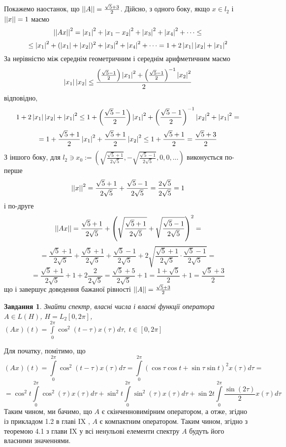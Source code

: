 \documentclass[12pt]{article} %
\newtheorem{prob}{Завдання}
\let\oldint\int
\renewcommand{\int}{\oldint\limits}
\begin{document}
	Покажемо наостанок, що $\left|\left|A\right|\right|=\frac{\sqrt{5}+3}{2}$. Дійсно, з одного боку, якщо $x\in l_2$ і $\left|\left|x\right|\right|=1$ маємо
	\[\left|\left|Ax\right|\right|^2=\left|x_1\right|^2+\left|x_1-x_2\right|^2+\left|x_3\right|^2+\left|x_4\right|^2+\dots\leq\]
	\[\leq \left|x_1\right|^2+(\left|x_1\right|+\left|x_2\right|)^2+\left|x_3\right|^2+\left|x_4\right|^2+\dots=1+2\left|x_1\right|\left|x_2\right|+\left|x_1\right|^2\]
	За нерівністю між середнім геометричним і середнім арифметичним маємо
	\[\left|x_1\right|\left|x_2\right|\leq\frac{\left({\frac{\sqrt{5}-1}{2}}\right)\left|x_1\right|^2+\left(\frac{\sqrt{5}-1}{2}\right)^{-1}\left|x_2\right|^2}{2}\]
	відповідно,
	\[1+2\left|x_1\right|\left|x_2\right|+\left|x_1\right|^2
	\leq1+\left({\frac{\sqrt{5}-1}{2}}\right)\left|x_1\right|^2+\left(\frac{\sqrt{5}-1}{2}\right)^{-1}\left|x_2\right|^2+\left|x_1\right|^2=\]
	\[=1+\frac{\sqrt{5}+1}{2}\left|x_1\right|^2+\frac{\sqrt{5}+1}{2}\left|x_2\right|^2\leq 1+\frac{\sqrt{5}+1}{2}=\frac{\sqrt{5}+3}{2}\]
	З іншого боку, для $l_2\ni x_0:=(\sqrt{\frac{\sqrt{5}+1}{2\sqrt{5}}},-\sqrt{\frac{\sqrt{5}-1}{2\sqrt{5}}},0,0,\dots)$ виконується
	по-перше
	\[\left|\left|x\right|\right|^2=\frac{\sqrt{5}+1}{2\sqrt{5}}+\frac{\sqrt{5}-1}{2\sqrt{5}}=\frac{2\sqrt{5}}{2\sqrt{5}}=1\]
	і по-друге
	\[\left|\left|Ax\right|\right|=\frac{\sqrt{5}+1}{2\sqrt{5}}+\left(\sqrt{\frac{\sqrt{5}+1}{2\sqrt{5}}}+\sqrt{\frac{\sqrt{5}-1}{2\sqrt{5}}}\right)^2=\]\[=
	\frac{\sqrt{5}+1}{2\sqrt{5}}+\frac{\sqrt{5}+1}{2\sqrt{5}}+{\frac{\sqrt{5}-1}{2\sqrt{5}}}+2\sqrt{
	\frac{\sqrt{5}+1}{2\sqrt{5}}\cdot\frac{\sqrt{5}-1}{2\sqrt{5}}}=\]
	\[=\frac{\sqrt{5}+1}{2\sqrt{5}}+1+2\frac{2}{2\sqrt{5}}=\frac{\sqrt{5}+5}{2\sqrt{5}}+1=\frac{1+\sqrt{5}}{2}+1=\frac{\sqrt{5}+3}{2}\]
	що і завершує доведення бажаної рівності $\left|\left|A\right|\right|=\frac{\sqrt{5}+3}{2}$
\begin{prob}Знайти спектр, власні числа і власні функції оператора $A\in L(H)$, $H=L_2[0,2\pi]$, $(Ax)(t)=\int_0^{2\pi}\cos^2(t-\tau)x(\tau)
	d\tau,\;t\in[0,2\pi]$
\end{prob}
Для початку, помітимо, що
\newcommand{\myint}[1]{\int_0^{2\pi}#1x(\tau)d\tau}
\[(Ax)(t)=\int_0^{2\pi}\cos^2(t-\tau)x(\tau)d\tau=\int_0^{2\pi}(\cos\tau\cos t+\sin\tau\sin t)^2x(\tau)d\tau=\]
\[=\cos^2 t\myint{\cos^2(\tau)}+\sin^2 t\myint{\sin^2(\tau)}+\sin 2t\myint{\frac{\sin (2\tau)}{2}}\]
Таким чином, ми бачимо, що $A$ є скінченновимірним оператором, а отже, згідно із прикладом 1.2 в главі IX \cite{tb}, 
$A$ є компактним оператором. Таким чином, згідно з теоремою 4.1 з глави IX у \cite{tb} всі ненульові елементи спектру $A$ будуть його власними
значеннями.
\end{document}
